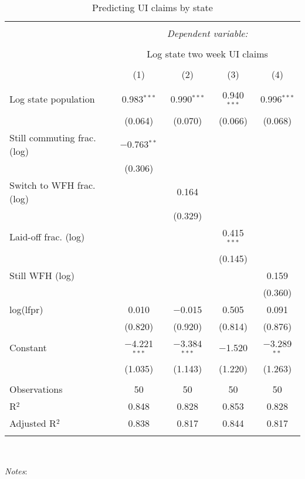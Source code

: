
\begin{table}[!htbp] \centering 
  \caption{Predicting UI claims by state} 
  \label{tab:ui} 
\small 
\begin{tabular}{@{\extracolsep{5pt}}lcccc} 
\\[-1.8ex]\hline 
\hline \\[-1.8ex] 
 & \multicolumn{4}{c}{\textit{Dependent variable:}} \\ 
\cline{2-5} 
\\[-1.8ex] & \multicolumn{4}{c}{Log state two week UI claims} \\ 
\\[-1.8ex] & (1) & (2) & (3) & (4)\\ 
\hline \\[-1.8ex] 
 Log state population & 0.983$^{***}$ & 0.990$^{***}$ & 0.940$^{***}$ & 0.996$^{***}$ \\ 
  & (0.064) & (0.070) & (0.066) & (0.068) \\ 
  Still commuting frac. (log) & $-$0.763$^{**}$ &  &  &  \\ 
  & (0.306) &  &  &  \\ 
  Switch to WFH frac. (log) &  & 0.164 &  &  \\ 
  &  & (0.329) &  &  \\ 
  Laid-off frac. (log) &  &  & 0.415$^{***}$ &  \\ 
  &  &  & (0.145) &  \\ 
  Still WFH (log) &  &  &  & 0.159 \\ 
  &  &  &  & (0.360) \\ 
  log(lfpr) & 0.010 & $-$0.015 & 0.505 & 0.091 \\ 
  & (0.820) & (0.920) & (0.814) & (0.876) \\ 
  Constant & $-$4.221$^{***}$ & $-$3.384$^{***}$ & $-$1.520 & $-$3.289$^{**}$ \\ 
  & (1.035) & (1.143) & (1.220) & (1.263) \\ 
 \hline \\[-1.8ex] 
Observations & 50 & 50 & 50 & 50 \\ 
R$^{2}$ & 0.848 & 0.828 & 0.853 & 0.828 \\ 
Adjusted R$^{2}$ & 0.838 & 0.817 & 0.844 & 0.817 \\ 
\hline 
\hline \\[-1.8ex] 
\end{tabular}
\\
\begin{minipage}{1.0 \textwidth}
{\footnotesize \emph{Notes}:
\starlanguage}
\end{minipage}
\end{table}
